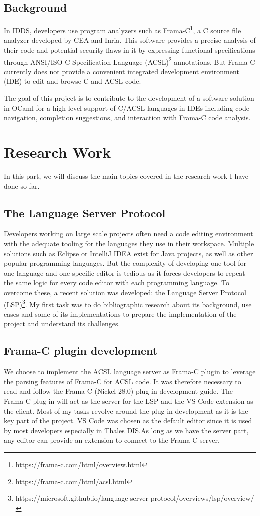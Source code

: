 \documentclass[10pt]{article}
\begin{document}
\begin{singlespace}
\subsection{Background}
In IDDS, developers use program analyzers such as Frama-C\footnote{https://frama-c.com/html/overview.html}, a C source file analyzer developed by CEA and Inria. This
software provides a precise analysis of their code and potential security flaws in it by expressing functional specifications through ANSI/ISO C Specification Language (ACSL)\footnote{https://frama-c.com/html/acsl.html} annotations. But Frama-C currently does not provide a convenient integrated development environment (IDE) to edit and browse C and ACSL code.

The goal of this project is to contribute to the development of a software solution in OCaml for a high-level support of C/ACSL languages in IDEs including code navigation, completion suggestions, and interaction with Frama-C code analysis.

\section{Research Work}
In this part, we will discuss the main topics covered in the research work I have done so far.
\subsection{The Language Server Protocol}
Developers working on large scale projects often need a code editing environment with the adequate tooling for the languages they use in their workspace. Multiple solutions such as Eclipse or IntelliJ IDEA exist for Java projects, as well as other popular programming languages. But the complexity of developing one tool for one language and one specific editor is tedious as it forces developers to repeat the same logic for every code editor with each programming language. To overcome these, a recent solution was developed: the Language Server Protocol (LSP)\footnote{https://microsoft.github.io/language-server-protocol/overviews/lsp/overview/}. My first task was to do bibliographic research about its background, use cases and some of its implementations to prepare the implementation of the project and understand its challenges.

\subsection{Frama-C plugin development}
We choose to implement the ACSL language server as Frama-C plugin to leverage the parsing features of Frama-C for ACSL code. It was therefore necessary to read and follow the Frama-C (Nickel 28.0) plug-in development guide. The Frama-C plug-in will act as the server for the LSP and the VS Code extension as the client. Most of my tasks revolve around the plug-in development as it is the key part of the project. VS Code was chosen as the default editor since it is used by most developers especially in Thales DIS.\@ As long as we have the server part, any editor can provide an extension to connect to the Frama-C server.


\end{singlespace}
\end{document}
